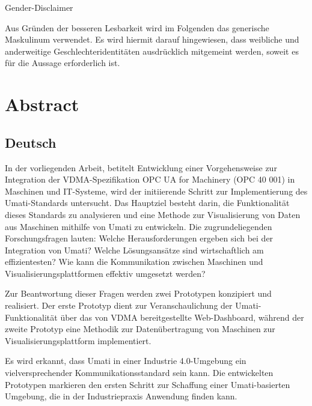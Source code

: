 \documentclass[a4paper, 12pt, oneside, toc=listofnumbered, bibliography=totoc]{scrbook}
\begin{document}
	\frontmatter
	
	
	\tableofcontents
	\listoffigures
	\nocite{*}
	
	\pagebreak
	\begin{center}
		\large Gender-Disclaimer
	\end{center}
	\vspace{0.5cm}
	
	\noindent Aus Gründen der besseren Lesbarkeit wird im Folgenden das generische Maskulinum verwendet. Es wird hiermit darauf hingewiesen, dass weibliche und anderweitige Geschlechteridentitäten ausdrücklich mitgemeint werden, soweit es für die Aussage erforderlich ist.
	
	\vspace{3cm}
	\pagebreak
	
	\chapter*{Abstract}
	\section*{Deutsch}
	
	In der vorliegenden Arbeit, betitelt \glqq Entwicklung einer Vorgehensweise zur Integration der VDMA-Spezifikation \glq OPC UA for Machinery (OPC 40 001)\grq{} in Maschinen und IT-Systeme\grqq{}, wird der initiierende Schritt zur Implementierung des Umati-Standards untersucht. Das Hauptziel besteht darin, die Funktionalität dieses Standards zu analysieren und eine Methode zur Visualisierung von Daten aus Maschinen mithilfe von Umati zu entwickeln. Die zugrundeliegenden Forschungsfragen lauten: Welche Herausforderungen ergeben sich bei der Integration von Umati? Welche Lösungsansätze sind wirtschaftlich am effizientesten? Wie kann die Kommunikation zwischen Maschinen und Visualisierungsplattformen effektiv umgesetzt werden?
	
	Zur Beantwortung dieser Fragen werden zwei Prototypen konzipiert und realisiert. Der erste Prototyp dient zur Veranschaulichung der Umati-Funktionalität über das von VDMA bereitgestellte Web-Dashboard, während der zweite Prototyp eine Methodik zur Datenübertragung von Maschinen zur Visualisierungsplattform implementiert.
	
	Es wird erkannt, dass Umati in einer Industrie 4.0-Umgebung ein vielversprechender Kommunikationsstandard sein kann. Die entwickelten Prototypen markieren den ersten Schritt zur Schaffung einer Umati-basierten Umgebung, die in der Industriepraxis Anwendung finden kann.
	
\end{document}
